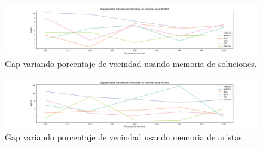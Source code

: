 \documentclass[10pt,a4paper]{article}
\begin{document}
\begin{figure}[h!]
    \centering
    \includegraphics[scale=0.3]{Graphs-metaH/vecindad-gap-METAH1.png}
    \caption{Gap variando porcentaje de vecindad usando memoria de soluciones.}
    \label{fig:exp_porc_gap_metah1}
\end{figure}

\begin{figure}[h!]
    \centering
    \includegraphics[scale=0.3]{Graphs-metaH/vecindad-gap-METAH2.png}
    \caption{Gap variando porcentaje de vecindad usando memoria de aristas.}
    \label{fig:exp_porc_gap_metah2}
\end{figure}
\end{document}
